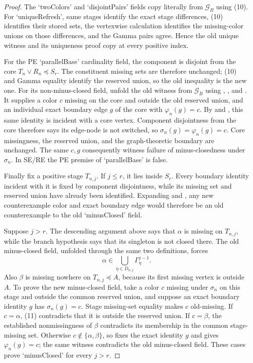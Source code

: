 \begin{proof}
The `twoColors' and `disjointPairs' fields copy literally from
$\mathcal G_B$ using (10).  For `uniqueRefresh', same stages identify the
exact stage differences, (10) identifies their stored sets, the
vertexwise calculation identifies the missing-color unions on those
differences, and the Gamma pairs agree.  Hence the old unique witness and
its uniqueness proof copy at every positive index.

For the PE `parallelBase' cardinality field, the component is disjoint
from the core $T_n\vee R_n\preccurlyeq S_r$.  The constituent missing
sets are therefore unchanged; (10) and Gamma equality identify the
reserved union, so the old inequality is the new one.  For its
non-minus-closed field, unfold the old witness from $\mathcal G_B$ using
, , and
.  It supplies a color $c$ missing on the
core and outside the old reserved union, and an individual exact boundary
edge $g$ of the core with $\varphi_n(g)=c$.  By
 and , this same identity
is incident with a core vertex.  Component disjointness from the core
therefore says its edge-node is not switched, so
$\sigma_n(g)=\varphi_n(g)=c$.  Core missingness, the reserved union, and
the graph-theoretic boundary are unchanged.  The same $c,g$ consequently
witness failure of minus-closedness under $\sigma_n$.  In SE/RE the PE
premise of `parallelBase' is false.

Finally fix a positive stage $T_{n,j}$.  If $j\leq r$, it lies inside
$S_r$.  Every boundary identity incident with it is fixed by component
disjointness, while its missing set and reserved union have already been
identified.  Expanding  and
, any new counterexample color and exact
boundary edge would therefore be an old counterexample to the old
`minusClosed' field.

Suppose $j>r$.  The descending argument above says that $\alpha$ is
missing on $T_{n,j}$, while the branch hypothesis says that its singleton
is not closed there.  The old minus-closed field, unfolded through the
same two definitions, forces
\[
 \alpha\in
   \bigcup_{\eta\in D_{n,j}}\Gamma^{j-1}_\eta.                 \tag{11}
\]
Also $\beta$ is missing nowhere on $T_{n,j}\preccurlyeq A$, because its
first missing vertex is outside $A$.  To prove the new minus-closed
field, take a color $c$ missing under $\sigma_n$ on this stage and outside
the common reserved union, and suppose an exact boundary identity $g$
has $\sigma_n(g)=c$.  Stage missing-set equality makes $c$ old-missing.
If $c=\alpha$, (11) contradicts that it is outside the reserved union.
If $c=\beta$, the established nonmissingness of $\beta$ contradicts its
membership in the common stage-missing set.  Otherwise
$c\notin\{\alpha,\beta\}$, so  fixes the
exact identity $g$ and gives $\varphi_n(g)=c$; the same
 witness contradicts the old minus-closed
field.  These cases prove `minusClosed' for every $j>r$.


\end{proof}
